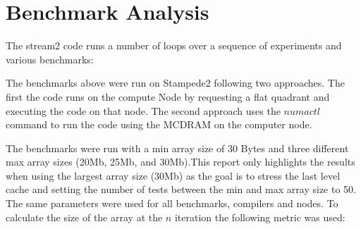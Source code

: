 \documentclass[12pt]{article} %
\begin{document}

%
%

\section{Benchmark Analysis}



The stream2 code runs a number of loops over a sequence of experiments and various benchmarks:

\begin{table}[ht]
\centering
{}
\end{table}

The benchmarks above were run on Stampede2 following two approaches. The first the code runs on the compute Node by requesting a flat quadrant and executing the code on that node. The second approach uses the $numactl$ command to run the code using the MCDRAM on the computer node. 

The benchmarks were run with a min array size of 30 Bytes and three different max array sizes (20Mb, 25Mb, and 30Mb).This report only highlights the results when using the largest array size (30Mb) as the goal is to stress the last level cache and setting the number of tests between the min and max array size to 50. The same parameters were used for all benchmarks, compilers and nodes. To calculate the size of the array at the $n$ iteration the following metric was used:
\end{document}
